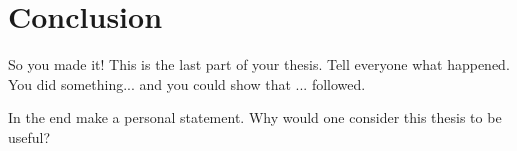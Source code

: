 \chapter{Conclusion}\label{chapter:conclusion}
So you made it!
This is the last part of your thesis.
Tell everyone what happened.
You did something... and you could show that ... followed.

In the end make a personal statement.
Why would one consider this thesis to be useful?



